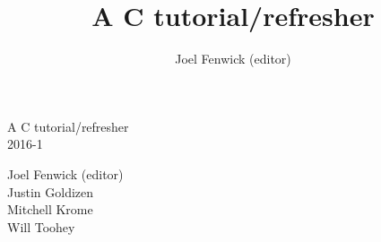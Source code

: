 \documentclass[a4paper,10pt]{book}
\begin{document}
\title{A C tutorial/refresher}
\author{Joel Fenwick (editor)}
\pagestyle{empty}

\vspace*{6cm}
\begin{center}
{\LARGE A C tutorial/refresher}\\
{\large 2016-1}\\
\end{center}
\vfill
\begin{flushright}
Joel Fenwick (editor)\\
Justin Goldizen\\
Mitchell Krome\\
Will Toohey 
\end{flushright}
\vfill
\vfill

\tableofcontents
{}
\lstset{language=C}












\appendix

\end{document}
